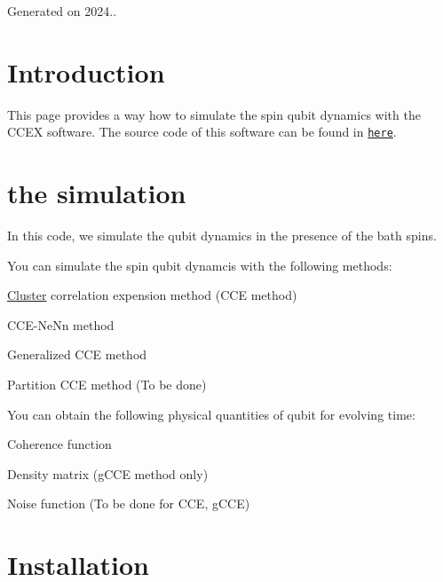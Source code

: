 Generated on 2024..\hypertarget{index_Introduction}{}\section{Introduction}\label{index_Introduction}
This page provides a way how to simulate the spin qubit dynamics with the C\-C\-E\-X software. The source code of this software can be found in \href{https://github.com/HuijinPark/CCEX}{\tt here}.\hypertarget{index_About}{}\section{the simulation}\label{index_About}
In this code, we simulate the qubit dynamics in the presence of the bath spins.

You can simulate the spin qubit dynamcis with the following methods\-:
\begin{DoxyItemize}
\item \hyperlink{structCluster}{Cluster} correlation expension method (C\-C\-E method)
\item C\-C\-E-\/\-Ne\-Nn method
\item Generalized C\-C\-E method
\item Partition C\-C\-E method (To be done)
\end{DoxyItemize}

You can obtain the following physical quantities of qubit for evolving time\-:
\begin{DoxyItemize}
\item Coherence function
\item Density matrix (g\-C\-C\-E method only)
\item Noise function (To be done for C\-C\-E, g\-C\-C\-E)
\end{DoxyItemize}\hypertarget{index_Installation}{}\section{Installation}\label{index_Installation}




